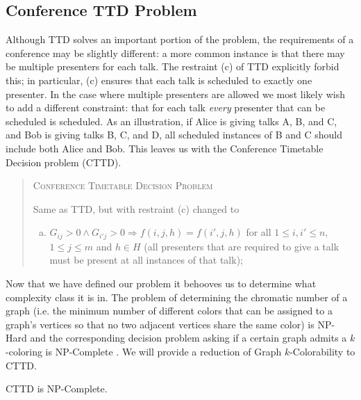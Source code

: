 \documentclass{svjour3}                     %
\begin{document}
\subsection{Conference TTD Problem}
Although TTD solves an important portion of the problem, the requirements of a conference may be slightly different: a more common instance is that there may be multiple presenters for each talk. The restraint (c) of TTD explicitly forbid this; in particular, (c) ensures that each talk is scheduled to exactly one presenter. In the case where multiple presenters are allowed we most likely wish to add a different constraint: that for each talk \emph{every} presenter that can be scheduled is scheduled. As an illustration, if Alice is giving talks A, B, and C, and Bob is giving talks B, C, and D, all scheduled instances of B and C should include both Alice and Bob. This leaves us with the Conference Timetable Decision problem (CTTD).
\begin{quote}
	\textsc{Conference Timetable Decision Problem}
	
	Same as TTD, but with restraint (c) changed to
	\begin{enumerate}[(c)]
		\item $G_{ij} > 0 \land G_{i'j} > 0 \Rightarrow f(i,j,h)=f(i',j,h)$ for all $1 \le i,i' \le n$, $1 \le j \le m$ and $h \in H$ (all presenters that are required to give a talk must be present at all instances of that talk);
	\end{enumerate}
\end{quote}
Now that we have defined our problem it behooves us to determine what complexity class it is in. The problem of determining the chromatic number of a graph (i.e. the minimum number of different colors that can be assigned to a graph's vertices so that no two adjacent vertices share the same color) is NP-Hard and the corresponding decision problem asking if a certain graph admits a $k$-coloring is NP-Complete \cite{garey76_2}. We will provide a reduction of Graph $k$-Colorability to CTTD.
\begin{theorem}
	CTTD is NP-Complete.
\end{theorem}
\end{document}
